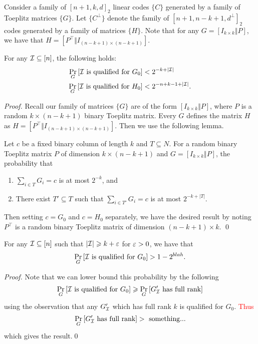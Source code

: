 Consider a family of $[n+1,k,d]_2$ linear codes $\{C\}$ generated by a family of Toeplitz matrices $\{G\}$.
Let $\{C^\perp\}$ denote the family of $[n+1, n-k+1,d^\perp]_2$ codes generated by a family of matrices $\{H\}$.
Note that for any $G = [I_{k\times k} \Vert P]$, we have that $H = [P^\top\Vert I_{(n-k+1)\times (n-k+1)}]$.

\begin{lemma}\label{lem:qual}
	For any ${\mathcal I} \subseteq [n]$, the following holds:
	\begin{align*}
		\Pr_G\left[{\mathcal I} \text{ is qualified for } G_0\right] &< 2^{-k+|{\mathcal I}|}\\
		\Pr_G\left[{\mathcal I} \text{ is qualified for } H_0\right] &< 2^{-n+k-1+|{\mathcal I}|}.
	\end{align*}
\end{lemma}
\begin{proof}
	Recall our family of matrices $\{G\}$ are of the form $[I_{k\times k}\Vert P]$, where $P$ is a random $k\times (n-k+1)$ binary Toeplitz matrix.
	Every $G$ defines the matrix $H$ as $H = [P^\top\Vert I_{(n-k+1)\times (n-k+1)}]$.
	Then we use the following lemma.
	\begin{importedlemma}
		Let $c$ be a fixed binary column of length $k$ and $T \subseteq N$.
		For a random binary Toeplitz matrix $P$ of dimension $k \times (n-k+1)$ and $G = [I_{k \times k}\Vert P]$, the probability that
		\begin{enumerate}
			\item $\sum_{i \in T} G_i = c$ is at most $2^{-k}$, and
			\item There exist $T' \subseteq T$ such that $\sum_{i \in T'} G_i = c$ is at most $2^{-k+|T|}$.
		\end{enumerate}
	\end{importedlemma}
	Then setting $c = G_0$ and $c= H_0$ separately, we have the desired result by noting $P^\top$ is a random binary Toeplitz matrix of dimension $(n-k+1) \times k$. \qed
\end{proof}

\begin{lemma}
	For any ${\mathcal I} \subseteq [n]$ such that $|{\mathcal I}| \geqslant k + \varepsilon$ for $\varepsilon > 0$, we have that
	\begin{align*}
		\Pr_G\left[ {\mathcal I} \text{ is qualified for } G_0 \right] > 1-2^{blah}.
	\end{align*}
\end{lemma}
\begin{proof}
	Note that we can lower bound this probability by the following
	\begin{align*}
		\Pr_G\left[{\mathcal I} \text{ is qualified for } G_0\right] \geqslant \Pr_G\left[G_{\mathcal I}' \text{ has full rank}\right]
	\end{align*}
	using the observation that any $G_{\mathcal I}'$ which has full rank $k$ is qualified for $G_0$.
	\textcolor{red}{Thus
	\begin{align*}
		\Pr_G\left[G_{\mathcal I}' \text{ has full rank}\right] > \text{ something...}
	\end{align*}}
	which gives the result.\qed
\end{proof}


